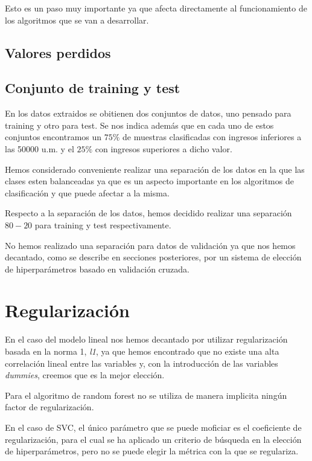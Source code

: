 \documentclass[a4paper,11pt]{article}
\begin{document}
Esto es un paso muy importante ya que afecta directamente al funcionamiento 
de los algoritmos que se van a desarrollar.

\subsection{Valores perdidos}




\subsection{Conjunto de training y test}

En los datos extraidos se obitienen dos conjuntos de datos, uno pensado para
training y otro para test. Se nos indica además que en cada uno de estos
conjuntos encontramos un $75\%$ de muestras clasificadas con ingresos inferiores
a las 50000 u.m. y el $25\%$ con ingresos superiores a dicho valor. 

Hemos considerado conveniente realizar una separación de los datos en la que las
clases esten balanceadas ya que es un aspecto importante en los algoritmos de
clasificación y que puede afectar a la misma. 

Respecto a la separación de los datos, hemos decidido realizar una separación
$80-20$ para training y test respectivamente.

No hemos realizado una separación para datos de validación ya que nos hemos
decantado, como se describe en secciones posteriores, por un sistema de elección
de hiperparámetros basado en validación cruzada.

\section{Regularización}

En el caso del modelo lineal nos hemos decantado por utilizar regularización
basada en la norma 1, \textit{l1}, ya que hemos encontrado que no existe una
alta correlación lineal entre las variables y, con la introducción de las
variables \textit{dummies}, creemos que es la mejor elección. 

Para el algoritmo de random forest no se utiliza de manera implicita ningún
factor de regularización.

En el caso de SVC, el único parámetro que se puede moficiar es el coeficiente de
regularización, para el cual se ha aplicado un criterio de búsqueda en la
elección de hiperparámetros, pero no se puede elegir la métrica con la que se
regulariza.
\end{document}
